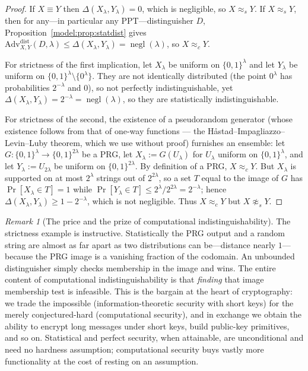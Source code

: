 \documentclass[11pt,a4paper]{article}
\theoremstyle{definition}
\theoremstyle{remark}
\newtheorem{remark}[theorem]{Remark}
\DeclareMathOperator{\negl}{negl}
\begin{document}
\begin{proof}
If \(X \equiv Y\) then \(\Delta(X_\lambda,Y_\lambda)=0\), which is negligible, so
\(X \approx_s Y\). If \(X \approx_s Y\), then for any---in particular any
PPT---distinguisher \(D\),
Proposition~\ref{model:prop:statdist} gives
\(\mathrm{Adv}^{\mathrm{dist}}_{X,Y}(D,\lambda) \leq \Delta(X_\lambda,Y_\lambda)
= \negl(\lambda)\), so \(X \approx_c Y\).

For strictness of the first implication, let \(X_\lambda\) be uniform on
\(\{0,1\}^\lambda\) and let \(Y_\lambda\) be uniform on
\(\{0,1\}^\lambda \setminus \{0^\lambda\}\). They are not identically distributed
(the point \(0^\lambda\) has probabilities \(2^{-\lambda}\) and \(0\)), so not
perfectly indistinguishable, yet
\(\Delta(X_\lambda,Y_\lambda) = 2^{-\lambda} = \negl(\lambda)\), so they are
statistically indistinguishable.

For strictness of the second, the existence of a pseudorandom generator
(whose existence follows from that of one-way functions --- the
H\aa stad--Impagliazzo--Levin--Luby theorem, which we use without proof) furnishes an
ensemble: let \(G : \{0,1\}^\lambda \to \{0,1\}^{2\lambda}\) be a PRG, let
\(X_\lambda := G(U_\lambda)\) for \(U_\lambda\) uniform on \(\{0,1\}^\lambda\), and
let \(Y_\lambda := U_{2\lambda}\) be uniform on \(\{0,1\}^{2\lambda}\). By
definition of a PRG, \(X \approx_c Y\). But \(X_\lambda\) is supported on at most
\(2^\lambda\) strings out of \(2^{2\lambda}\), so a set \(T\) equal to the image of
\(G\) has \(\Pr[X_\lambda \in T] = 1\) while
\(\Pr[Y_\lambda \in T] \leq 2^\lambda/2^{2\lambda} = 2^{-\lambda}\); hence
\(\Delta(X_\lambda,Y_\lambda) \geq 1 - 2^{-\lambda}\), which is not negligible.
Thus \(X \approx_c Y\) but \(X \not\approx_s Y\).
\end{proof}

\begin{remark}[The price and the prize of computational indistinguishability]\label{model:rem:comp-price}
The strictness example is instructive. Statistically the PRG output and a random
string are almost as far apart as two distributions can be---distance nearly
\(1\)---because the PRG image is a vanishing fraction of the codomain. An
unbounded distinguisher simply checks membership in the image and wins. The
entire content of computational indistinguishability is that \emph{finding} that
image membership test is infeasible. This is the bargain at the heart of
cryptography: we trade the impossible (information-theoretic security with short
keys) for the merely conjectured-hard (computational security), and in exchange
we obtain the ability to encrypt long messages under short keys, build public-key primitives,
and so on. Statistical and perfect security, when attainable, are unconditional
and need no hardness assumption; computational security buys vastly more
functionality at the cost of resting on an assumption.
\end{remark}
\end{document}
